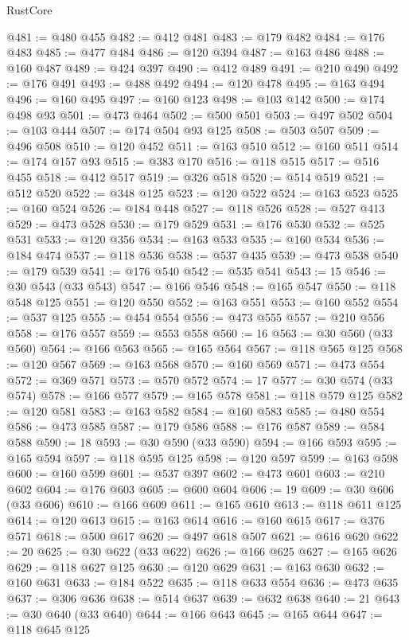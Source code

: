 \begin{lexlean}{RustCore}
\begin{coremodule}
@481 := @480 @455
@482 := @412 @481
@483 := @179 @482
@484 := @176 @483
@485 := @477 @484
@486 := @120 @394
@487 := @163 @486
@488 := @160 @487
@489 := @424 @397
@490 := @412 @489
@491 := @210 @490
@492 := @176 @491
@493 := @488 @492
@494 := @120 @478
@495 := @163 @494
@496 := @160 @495
@497 := @160 @123
@498 := @103 @142
@500 := @174 @498 @93
@501 := @473 @464
@502 := @500 @501
@503 := @497 @502
@504 := @103 @444
@507 := @174 @504 @93 @125
@508 := @503 @507
@509 := @496 @508
@510 := @120 @452
@511 := @163 @510
@512 := @160 @511
@514 := @174 @157 @93
@515 := @383 @170
@516 := @118 @515
@517 := @516 @455
@518 := @412 @517
@519 := @326 @518
@520 := @514 @519
@521 := @512 @520
@522 := @348 @125
@523 := @120 @522
@524 := @163 @523
@525 := @160 @524
@526 := @184 @448
@527 := @118 @526
@528 := @527 @413
@529 := @473 @528
@530 := @179 @529
@531 := @176 @530
@532 := @525 @531
@533 := @120 @356
@534 := @163 @533
@535 := @160 @534
@536 := @184 @474
@537 := @118 @536
@538 := @537 @435
@539 := @473 @538
@540 := @179 @539
@541 := @176 @540
@542 := @535 @541
@543 := 15
@546 := @30 @543 (@33 @543)
@547 := @166 @546
@548 := @165 @547
@550 := @118 @548 @125
@551 := @120 @550
@552 := @163 @551
@553 := @160 @552
@554 := @537 @125
@555 := @454 @554
@556 := @473 @555
@557 := @210 @556
@558 := @176 @557
@559 := @553 @558
@560 := 16
@563 := @30 @560 (@33 @560)
@564 := @166 @563
@565 := @165 @564
@567 := @118 @565 @125
@568 := @120 @567
@569 := @163 @568
@570 := @160 @569
@571 := @473 @554
@572 := @369 @571
@573 := @570 @572
@574 := 17
@577 := @30 @574 (@33 @574)
@578 := @166 @577
@579 := @165 @578
@581 := @118 @579 @125
@582 := @120 @581
@583 := @163 @582
@584 := @160 @583
@585 := @480 @554
@586 := @473 @585
@587 := @179 @586
@588 := @176 @587
@589 := @584 @588
@590 := 18
@593 := @30 @590 (@33 @590)
@594 := @166 @593
@595 := @165 @594
@597 := @118 @595 @125
@598 := @120 @597
@599 := @163 @598
@600 := @160 @599
@601 := @537 @397
@602 := @473 @601
@603 := @210 @602
@604 := @176 @603
@605 := @600 @604
@606 := 19
@609 := @30 @606 (@33 @606)
@610 := @166 @609
@611 := @165 @610
@613 := @118 @611 @125
@614 := @120 @613
@615 := @163 @614
@616 := @160 @615
@617 := @376 @571
@618 := @500 @617
@620 := @497 @618 @507
@621 := @616 @620
@622 := 20
@625 := @30 @622 (@33 @622)
@626 := @166 @625
@627 := @165 @626
@629 := @118 @627 @125
@630 := @120 @629
@631 := @163 @630
@632 := @160 @631
@633 := @184 @522
@635 := @118 @633 @554
@636 := @473 @635
@637 := @306 @636
@638 := @514 @637
@639 := @632 @638
@640 := 21
@643 := @30 @640 (@33 @640)
@644 := @166 @643
@645 := @165 @644
@647 := @118 @645 @125

\end{coremodule}
\end{lexlean}

